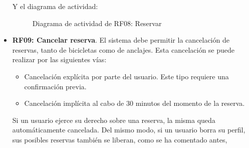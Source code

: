 \begin{itemize}
	Y el diagrama de actividad:
	\begin{figure}[!htb]
		\centering
		\caption{Diagrama de actividad de RF08: Reservar}
		\label{fig:diagramaActividad_RF08}
	\end{figure}
	
	\FloatBarrier
	\item \textbf{RF09: Cancelar reserva}. El sistema debe permitir la cancelación de reservas, tanto de bicicletas como de anclajes. Esta cancelación se puede realizar por las siguientes vías:
	\begin{itemize}
		\item Cancelación explícita por parte del usuario. Este tipo requiere una confirmación previa.
		\item Cancelación implícita al cabo de 30 minutos del momento de la reserva.
	\end{itemize}
	Si un usuario ejerce su derecho sobre una reserva, la misma queda automáticamente cancelada. Del mismo modo, si un usuario borra su perfil, sus posibles reservas también se liberan, como se ha comentado antes,
	

\end{itemize}
